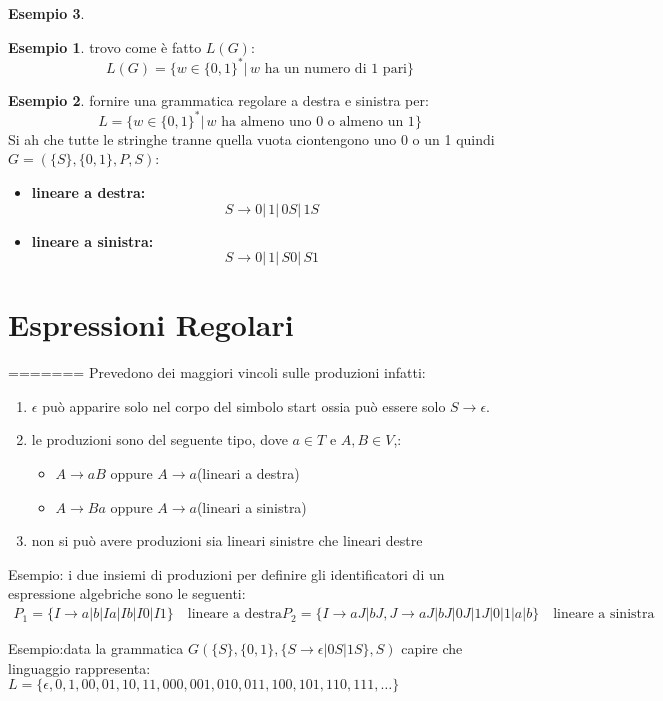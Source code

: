 \documentclass[a4paper]{book}
\theoremstyle{definition}%
\newtheorem*{esempio}{Esempio}
\begin{document}
\begin{esempio}
\begin{esempio}
trovo come è fatto $L(G)$:
$$L(G)=\{w\in\{0,1\}^*|\, w \mbox{ ha un numero di 1 pari}\}$$
\end{esempio}
\begin{esempio}
fornire una grammatica regolare a destra e sinistra per:
$$L=\{w\in\{0,1\}^*|\, w \mbox{ ha almeno uno 0 o almeno un 1}\}$$
Si ah che tutte le stringhe tranne quella vuota ciontengono uno 0 o un 1
quindi  $G=(\{S\},\{0,1\},P,S)$:
\begin{itemize}
\item \textbf{lineare a destra:}
$$S\to 0|\,1|\,0S|\,1S$$
\item \textbf{lineare a sinistra:} 
$$S\to 0|\,1|\,S0|\,S1$$
\end{itemize}
\end{esempio}

\section{Espressioni Regolari}
=======
  Prevedono dei maggiori vincoli sulle produzioni infatti:
  \begin{enumerate}
  \item $\epsilon$ può apparire solo nel corpo del simbolo start ossia può essere solo $S \to \epsilon$.
  \item le produzioni sono del seguente tipo, dove $a \in T$ e $A, B \in V$,:
    \begin{itemize}
    \item $A \to aB$ oppure $A \to a$(lineari a destra)
    \item $A \to Ba$ oppure $A \to a$(lineari a sinistra)
      \end{itemize}
  \item non si può avere produzioni sia lineari sinistre che lineari destre
  \end{enumerate}

  Esempio: i due insiemi di produzioni per definire gli identificatori di un espressione algebriche sono le seguenti:
  \begin{align*}
    P_1 = \{I \to a | b | Ia| Ib| I0 | I1\} \quad \text{lineare a destra}
    P_2 = \{I \to aJ | bJ, J \to aJ | bJ | 0J | 1J | 0 | 1 | a | b\} \quad \text{lineare a sinistra}
  \end{align*}

  Esempio:data la grammatica $G(\{S\},\{0,1\},\{S \to \epsilon | 0S | 1S\},S)$ capire che linguaggio rappresenta:
  $L = \{\epsilon, 0, 1, 00, 01, 10, 11, 000, 001, 010, 011, 100, 101, 110, 111, \dots \}$


\end{esempio}
\end{document}
